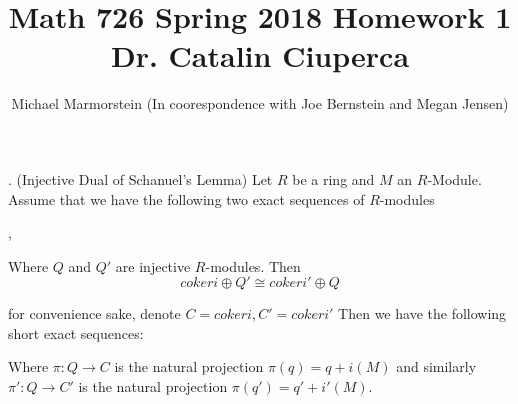\documentclass{article}
\title{Math 726 Spring 2018 Homework 1 Dr. Catalin Ciuperca}
\author{Michael Marmorstein \vspace{0.2pt} (In coorespondence with Joe Bernstein and Megan Jensen)}
\begin{document}
. (Injective Dual of Schanuel's Lemma) 
\newline
Let $R$ be a ring and $M$ an $R$-Module.  Assume that we have the following two exact sequences of $R$-modules
\newline
\begin{center}
\newline
{},
\newline
\end{center}
Where $Q$ and $Q'$ are injective $R$-modules.
Then 
$$coker i \oplus Q' \cong coker i' \oplus Q $$

\proof
for convenience sake, denote $C= coker i, C' = coker i'$ 
\newline
Then we have the following short exact sequences:
\newline
{}
\newline
{}
\newline
Where $\pi:Q \rightarrow C$ is the natural projection $\pi(q) = q + i(M)$
and similarly $\pi':Q \rightarrow C'$ is the natural projection $\pi(q') = q' + i'(M)$.
\end{document}

